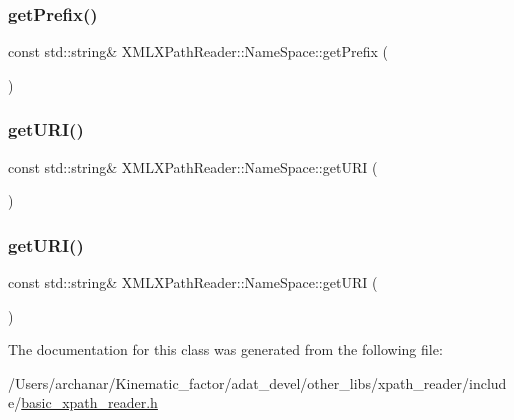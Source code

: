 \subsubsection{\texorpdfstring{getPrefix()}{getPrefix()}\hspace{0.1cm}{\footnotesize\ttfamily [2/2]}}
{\footnotesize\ttfamily const std\+::string\& X\+M\+L\+X\+Path\+Reader\+::\+Name\+Space\+::get\+Prefix (\begin{DoxyParamCaption}{ }\end{DoxyParamCaption})\hspace{0.3cm}{\ttfamily [inline]}}

\mbox{\label{classXMLXPathReader_1_1NameSpace_a4845bf9963c2687097a8265cea22e703}} 
\subsubsection{\texorpdfstring{getURI()}{getURI()}\hspace{0.1cm}{\footnotesize\ttfamily [1/2]}}
{\footnotesize\ttfamily const std\+::string\& X\+M\+L\+X\+Path\+Reader\+::\+Name\+Space\+::get\+U\+RI (\begin{DoxyParamCaption}{ }\end{DoxyParamCaption})\hspace{0.3cm}{\ttfamily [inline]}}

\mbox{\label{classXMLXPathReader_1_1NameSpace_a4845bf9963c2687097a8265cea22e703}} 
\subsubsection{\texorpdfstring{getURI()}{getURI()}\hspace{0.1cm}{\footnotesize\ttfamily [2/2]}}
{\footnotesize\ttfamily const std\+::string\& X\+M\+L\+X\+Path\+Reader\+::\+Name\+Space\+::get\+U\+RI (\begin{DoxyParamCaption}{ }\end{DoxyParamCaption})\hspace{0.3cm}{\ttfamily [inline]}}



The documentation for this class was generated from the following file\+:\begin{DoxyCompactItemize}
\item 
/\+Users/archanar/\+Kinematic\+\_\+factor/adat\+\_\+devel/other\+\_\+libs/xpath\+\_\+reader/include/\mbox{\hyperlink{other__libs_2xpath__reader_2include_2basic__xpath__reader_8h}{basic\+\_\+xpath\+\_\+reader.\+h}}\end{DoxyCompactItemize}
